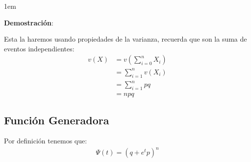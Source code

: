 \documentclass[12pt, fleqn]{report}                             %
\newenvironment{SmallIndentation}[1][0.75em]                    %
        {\begin{adjustwidth}{#1}{}\begin{footnotesize}}             %
        {\end{footnotesize}\end{adjustwidth}}                       %
\theoremstyle{break}                                            %
\newcommand{\Wrap}[1]           {\left( #1 \right)}             %
\begin{document}
                \begin{SmallIndentation}[1em]
                    \textbf{Demostración}:
                    
                    Esta la haremos usando propiedades de la varianza, recuerda que
                    son la suma de eventos independientes:
                    \begin{align*}
                        v(X) 
                            &= v\Wrap{\sum_{i=0}^n X_i}         \\
                            &= \sum_{i=1}^n v(X_i)              \\
                            &= \sum_{i=1}^n pq                  \\
                            &= npq
                    \end{align*}
                
                \end{SmallIndentation}
                   
            \vspace{1em}
            \subsection{Función Generadora}  

                Por definición tenemos que:
                \begin{align*}
                    \Psi (t) = \Wrap{q + e^tp}^n   
                \end{align*}
\end{document}
